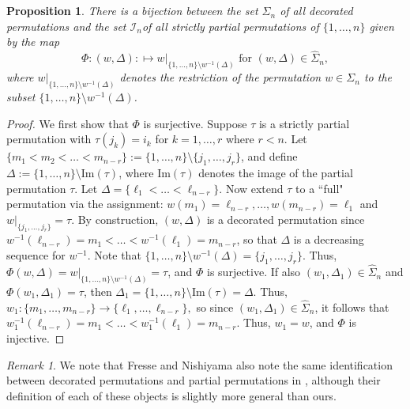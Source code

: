 \documentclass[12pt]{amsart}
\numberwithin{equation}{section}
\newtheorem{prop}[thm]{Proposition}
\theoremstyle{remark}
\newtheorem{rem}[thm]{Remark}
\theoremstyle{definition}
\begin{document}
\begin{prop}\label{p:strictly}
There is a bijection between the set $\widehat{\Sigma}_{n}$ of all decorated permutations and the set $\mathcal{I}_{n}$of all strictly partial permutations of $\{1,\dots, n\}$ given by the map
\begin{equation}\label{eq:partialbiject}
\Phi:(w,\Delta):\mapsto w|_{\{1,\dots, n\}\setminus w^{-1}(\Delta)} \mbox{ for } (w,\Delta)\in \widehat{\Sigma}_{n},
\end{equation}
 where $w|_{\{1,\dots, n\}\setminus w^{-1}(\Delta)}$ denotes the restriction of the permutation $w\in\Sigma_{n}$ to the subset $\{1,\dots, n\}\setminus w^{-1}(\Delta)$.
\end{prop}
\begin{proof}
We first show that $\Phi$ is surjective.  Suppose $\tau$ is a strictly partial permutation with 
$\tau(j_{k})=i_{k}$ for $k=1,\dots, r$ where $r<n$.  Let $\{m_{1}< m_{2}<\dots< m_{n-r}\}:=\{1,\dots, n\}\setminus \{j_{1},\dots, j_{r}\}$, and define 
$\Delta:=\{1,\dots, n\}\setminus\mbox{Im}(\tau)$, where $\mbox{Im}(\tau)$ denotes the image of the partial permutation $\tau$.   Let $\Delta=\{\ell_{1}<\dots< \ell_{n-r}\}$.  Now extend $\tau$ to a ``full" permutation via the assignment:  $w(m_{1})=\ell_{n-r},\dots, w(m_{n-r})=\ell_{1}$ and $w|_{\{j_{1},\dots, j_{r}\}}=\tau$.   By construction, $(w,\Delta)$ is a decorated permutation since
$w^{-1}(\ell_{n-r})=m_{1}<\dots<w^{-1}(\ell_{1})=m_{n-r}$, so that $\Delta$ is a decreasing sequence for $w^{-1}$.  Note that $\{1,\dots, n\}\setminus w^{-1}(\Delta)=\{j_{1},\dots, j_{r}\}$.  Thus, $\Phi(w,\Delta)=w|_{\{1,\dots, n\}\setminus w^{-1}(\Delta)}=\tau$, and $\Phi$ is surjective.  If also $(w_1,\Delta_1) \in \widehat{\Sigma}_n$ and  $\Phi(w_1,\Delta_1)=\tau$, then $\Delta_1=\{ 1, \dots, n\} \setminus \mbox{Im}(\tau) = \Delta.$  Thus, $w_1:\{m_1, \dots, m_{n-r} \} \to \{ \ell_1, \dots, \ell_{n-r} \},$ so since $(w_1, \Delta_1) \in \widehat{\Sigma}_n$, it follows that 
$w_1^{-1}(\ell_{n-r})=m_1 < \dots < w_1^{-1}(\ell_{1})=m_{n-r}.$   Thus, $w_1=w$, and $\Phi$ is injective.
\end{proof}

\begin{rem}
We note that Fresse and Nishiyama also note the same identification between decorated permutations and partial permutations in \cite{FN}, although their definition of each of these objects is slightly more general than ours.
\end{rem}
\end{document}

